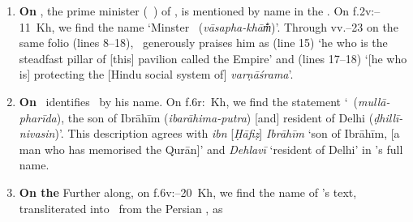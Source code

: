 \begin{enumerate}[topsep=0pt]
       \Nityananda\ traces the male ancestors of \Shahjahan\ from Tīmūr (\textit{taimūra}), Mīrān Shāh (\textit{mīrā-sāhā}), Sulṭān Muḥammad (\textit{sullā-mahaṃma}), Abū Sa\Ayn īd (\textit{abūsayīda}), Umar Shaykh (\textit{umara-śekha}), Bābur (\textit{bābara}), Humāyūn (\textit{humāū}), Akbar Shāh Jalāl al\=/Dīn (\textit{akabaraḥ śāha\-jallāladīna}), Jahāngīr (\textit{śrī-jahāṃgīra}), and finally, Shāh Jahān (\textit{śrīmān-sāhajahāṃ}) \parencite[vv.--11 on p.]{PetersonCatalogue}.\footnote{\,MS~Kh begins on f.\thinspace 2r in the middle of describing the genealogy of \Shahjahan. With the first folio missing and heavy damage to the second, I have relied on \citeauthor{PetersonCatalogue}'s transcription (\vid\ footnote~\ref{peterson_catalogue_siddhantasindhu_reference}) to fill in the missing parts.}
     \item \textbf{On \AsafKhanshort}\label{asaf_khan_siddhantasindhu}\quad \AsafKhan, the prime minister (\vazir\idafaconsonant\ \azam) of \Shahjahan, is mentioned by name in the \Siddhantasindhu. On f.\thinspace 2v:--11~Kh, we find the name  `Minster \AsafKhanshort\ (\textit{vāsapha-khām̐})'. Through vv.--23 on the same folio (lines 8--18), \Nityananda\ generously praises him as
      (line 15) `he who is the steadfast pillar of [this] pavilion called the Empire' and  (lines 17--18) `[he who is] protecting the [Hindu social system of] \textit{varṇāśrama}'.  
    \item \textbf{On \MullaFarid}\quad \label{mulla_farid_sanskrit_sidhantasindhu}\Nityananda\ identifies \MullaFarid\ by his name. On f.\thinspace 6r:~Kh, we find the statement
     `\MullaFarid\ (\textit{mullā-pharīda}), the son of Ibrāhīm (\textit{ibarāhima-putra}) [and] resident of Delhi (\textit{ḍhillī-nivasin})'. This description agrees with \textit{ibn} [\textit{Ḥāfiẓ}] \textit{Ibrāhīm} `son of Ibrāhīm, [a man who has memorised the Qur\Alif ān]' and \textit{Dehlavī} `resident of Delhi' in \MullaFarid's full name. 
     \item \textbf{On the \ZijiShahJahani}\quad \label{zij_shahjahani_sanskrit_siddhantasindhu}
    Further along, on f.\thinspace 6v:--20~Kh, we find the name of \MullaFarid's text, transliterated into \Nagari\ from the Persian \ZijiShahJahanifull, as
    \begin{multicols}{2}
     \columnbreak
    

\end{multicols}
\end{enumerate}
